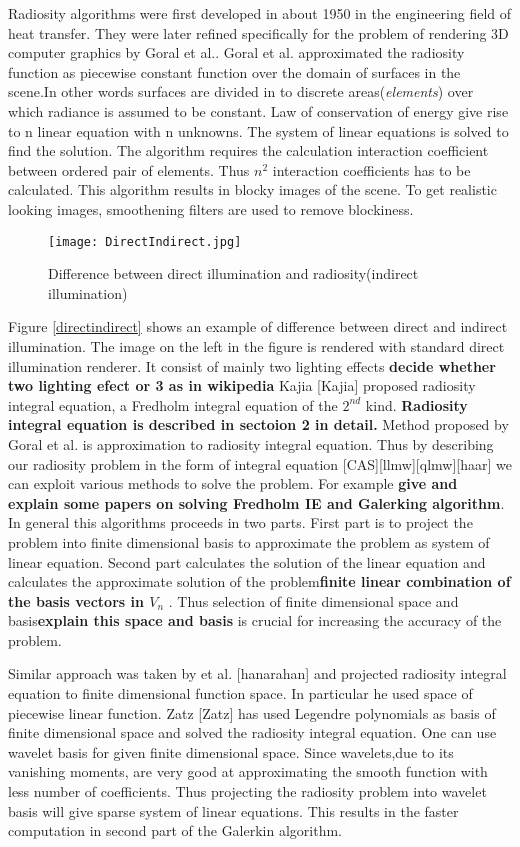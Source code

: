 Radiosity algorithms were first developed in about 1950 in the engineering field of heat transfer. They were later refined specifically for the problem of rendering 3D computer graphics by Goral et al.\cite{Goral}. Goral et al. approximated the radiosity function as piecewise constant function over the domain of surfaces in the scene.In other words surfaces are divided in to discrete areas({\em elements}) over which radiance is assumed to be constant. Law of conservation of energy give rise to n linear equation with n unknowns. The system of linear equations is solved to find the solution. The algorithm requires the calculation interaction coefficient between ordered pair of elements. Thus $n^2$ interaction coefficients has to be calculated. This algorithm results in blocky images of the scene. To get realistic looking images, smoothening filters are used to remove blockiness. 
\begin{figure}[tbh]
\centering{}
\captionsetup{justification=centering}
\texttt{[image: DirectIndirect.jpg]}
\caption{\label{fig:directindirect}Difference between direct illumination and radiosity(indirect illumination)}
\end{figure}
Figure \ref{directindirect} shows an example of difference between direct and indirect illumination. The image on the left in the figure is rendered with standard direct illumination renderer. It consist of mainly two lighting effects {\bf decide whether two lighting efect or 3 as in wikipedia}
Kajia [Kajia] proposed radiosity integral equation, a Fredholm integral equation of the $2^{nd}$ kind. { \bf Radiosity integral equation is described in sectoion 2 in detail.} Method proposed by Goral et al. \cite{Goral} is approximation to radiosity integral equation. Thus by describing  our radiosity problem in the form of integral equation [CAS][llmw][qlmw][haar] we can exploit various methods to solve the problem. For example  {\bf give and explain some papers on solving Fredholm IE and Galerking algorithm}. In general this algorithms proceeds in two parts. First part is to project the problem into finite dimensional basis to approximate the problem as system of linear equation. Second part calculates the solution of the linear equation and calculates the approximate solution of the problem{\bf  finite linear combination of the basis vectors in  $V_n$ }. Thus selection of finite dimensional space and basis{\bf explain this space and basis} is crucial for increasing the accuracy of the problem.

Similar approach was taken by et al. [hanarahan] and projected radiosity integral equation to finite dimensional function space. In particular he used space of piecewise linear function. Zatz [Zatz] has used Legendre polynomials as basis of finite dimensional space and solved the radiosity integral equation. One can use wavelet basis for given finite dimensional space. Since wavelets,due to its vanishing moments, are very good at approximating the smooth function with less number of coefficients. Thus projecting the radiosity problem into wavelet basis will give sparse system of linear equations. This results in the faster computation in second part of the Galerkin algorithm. 

